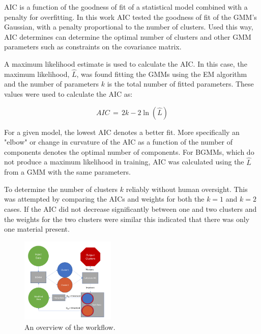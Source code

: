 \documentclass[a4paper,11pt]{article}
\begin{document}
AIC is a function of the goodness of fit of a statistical model combined with a penalty for overfitting. In this work AIC tested the goodness of fit of the GMM's Gaussian, with a penalty proportional to the number of clusters. Used this way, AIC determines can determine the optimal number of clusters and other GMM parameters such as constraints on the covariance matrix.

A maximum likelihood estimate is used to calculate the AIC. In this case, the maximum likelihood, $\hat L$, was found fitting the GMMs using the EM algorithm and the number of parameters $k$ is the total number of fitted parameters. These values were used to calculate the AIC as:

\begin{equation}
    AIC \, = \, 2k - 2\ln(\hat L)
\end{equation}

For a given model, the lowest AIC denotes a better fit. More specifically an "elbow" or change in curvature of the AIC as a function of the number of components denotes the optimal number of components. For BGMMs, which do not produce a maximum likelihood in training, AIC was calculated using the $\hat L$ from a GMM with the same parameters.

To determine the number of clusters $k$ reliably without human oversight. This was attempted by comparing the AICs and weights for both the $k=1$ and $k=2$ cases. If the AIC did not decrease significantly between one and two clusters and the weights for the two clusters were similar this indicated that there was only one material present.

\begin{figure}
  \begin{center}
    \includegraphics[width=0.4\textwidth]{figures/algo_flow.png}
  \end{center}
        \hspace*{-2in}
    \caption{An overview of the workflow.}
  
  \label{algo_flow}
\end{figure}
\end{document}

